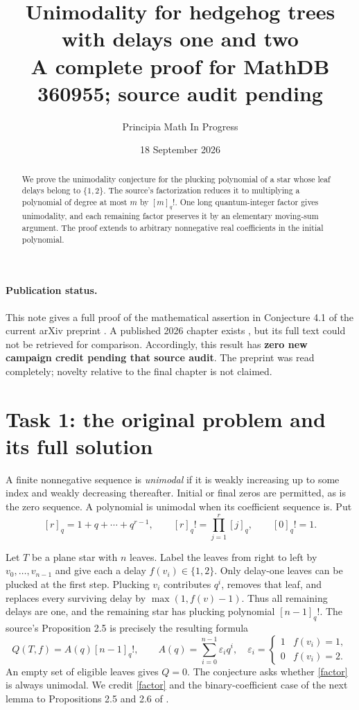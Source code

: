 \documentclass[11pt]{article}
\title{Unimodality for hedgehog trees with delays one and two\\
\large A complete proof for MathDB 360955; source audit pending}
\author{Principia Math In Progress}
\date{18 September 2026}
\begin{document}
\maketitle
\begin{abstract}
We prove the unimodality conjecture for the plucking polynomial
of a star whose leaf delays belong to $\{1,2\}$. The source's
factorization reduces it to multiplying a polynomial of degree
at most $m$ by $[m]_q!$. One long quantum-integer factor gives
unimodality, and each remaining factor preserves it by an
elementary moving-sum argument. The proof extends to arbitrary
nonnegative real coefficients in the initial polynomial.
\end{abstract}

\paragraph{Publication status.}
This note gives a full proof of the mathematical assertion in
Conjecture 4.1 of the current arXiv preprint \cite{ILMP}.
A published 2026 chapter exists \cite{final}, but its full text
could not be retrieved for comparison. Accordingly, this result
has \textbf{zero new campaign credit pending that source audit}.
The preprint was read completely; novelty relative to the final
chapter is not claimed.

\section*{Task 1: the original problem and its full solution}
A finite nonnegative sequence is \emph{unimodal} if it is weakly
increasing up to some index and weakly decreasing thereafter.
Initial or final zeros are permitted, as is the zero sequence.
A polynomial is unimodal when its coefficient sequence is.
Put
\[
 [r]_q=1+q+\cdots+q^{r-1},\qquad
 [r]_q!=\prod_{j=1}^r[j]_q,\qquad [0]_q!=1.
\]

Let $T$ be a plane star with $n$ leaves. Label the leaves from
right to left by $v_0,\ldots,v_{n-1}$ and give each a delay
$f(v_i)\in\{1,2\}$. Only delay-one leaves can be plucked at the
first step. Plucking $v_i$ contributes $q^i$, removes that leaf,
and replaces every surviving delay by $\max(1,f(v)-1)$.
Thus all remaining delays are one, and the remaining star has
plucking polynomial $[n-1]_q!$.
The source's Proposition 2.5 is precisely the resulting formula
\begin{equation}\label{factor}
 Q(T,f)=A(q)[n-1]_q!,\qquad
 A(q)=\sum_{i=0}^{n-1}\varepsilon_i q^i,
 \quad\varepsilon_i=\begin{cases}1&f(v_i)=1,\\0&f(v_i)=2.\end{cases}
\end{equation}
An empty set of eligible leaves gives $Q=0$.
The conjecture asks whether \eqref{factor} is always unimodal.
We credit \eqref{factor} and the binary-coefficient case of the
next lemma to Propositions 2.5 and 2.6 of \cite{ILMP}.
\end{document}
